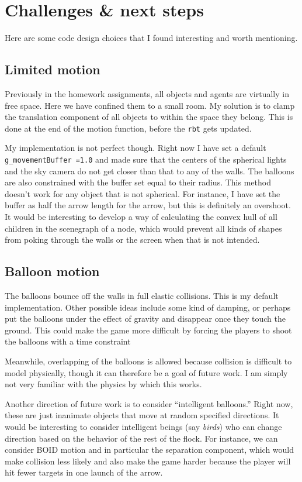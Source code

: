 \documentclass{article}[12pt]
\begin{document}
\section{Challenges \& next steps}
Here are some code design choices that I found interesting and worth mentioning. 

\subsection{Limited motion}
Previously in the homework assignments, all objects and agents are virtually in free space. Here we have confined them to a small room. My solution is to clamp the translation component of all objects to within the space they belong. This is done at the end of the motion function, before the \texttt{rbt} gets updated.

My implementation is not perfect though. Right now I have set a default \texttt{g\_movementBuffer =1.0} and made sure that the centers of the spherical lights and the sky camera do not get closer than that to any of the walls. The balloons are also constrained with the buffer set equal to their radius. This method doesn't work for any object that is not spherical. For instance, I have set the buffer as half the arrow length for the arrow, but this is definitely an overshoot. It would be interesting to develop a way of calculating the convex hull of all children in the scenegraph of a node, which would prevent all kinds of shapes from poking through the walls or the screen when that is not intended. 

\subsection{Balloon motion}
The balloons bounce off the walls in full elastic collisions. This is my default implementation. Other possible ideas include some kind of damping, or perhaps put the balloons under the effect of gravity and disappear once they touch the ground. This could make the game more difficult by forcing the players to shoot the balloons with a time constraint

Meanwhile, overlapping of the balloons is allowed because collision is difficult to model physically, though it can therefore be a goal of future work. I am simply not very familiar with the physics by which this works. 

Another direction of future work is to consider ``intelligent balloons.'' Right now, these are just inanimate objects that move at random specified directions. It would be interesting to consider intelligent beings (say \emph{birds}) who can change direction based on the behavior of the rest of the flock. For instance, we can consider BOID motion and in particular the separation component, which would make collision less likely and also make the game harder because the player will hit fewer targets in one launch of the arrow. 
\end{document}
